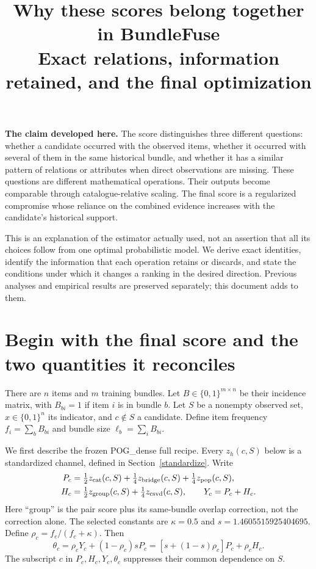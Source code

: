 \documentclass[11pt,a4paper]{article}
\title{Why these scores belong together in BundleFuse\\
\large Exact relations, information retained, and the final optimization}
\author{}\date{}
\begin{document}
\maketitle

\textbf{The claim developed here.}
The score distinguishes three different questions: whether a candidate occurred
with the observed items, whether it occurred with several of them in the same
historical bundle, and whether it has a similar pattern of relations or attributes
when direct observations are missing. These questions are different mathematical
operations. Their outputs become comparable through catalogue-relative scaling.
The final score is a regularized compromise whose reliance on the combined
evidence increases with the candidate's historical support.

This is an explanation of the estimator actually used, not an assertion that all
its choices follow from one optimal probabilistic model. We derive exact identities,
identify the information that each operation retains or discards, and state the
conditions under which it changes a ranking in the desired direction. Previous
analyses and empirical results are preserved separately; this document adds to them.

\section{Begin with the final score and the two quantities it reconciles}
There are $n$ items and $m$ training bundles. Let $B\in\{0,1\}^{m\times n}$
be their incidence matrix, with $B_{bi}=1$ if item $i$ is in bundle $b$.
Let $S$ be a nonempty observed set, $x\in\{0,1\}^n$ its indicator, and
$c\notin S$ a candidate. Define item frequency $f_i=\sum_b B_{bi}$ and
bundle size $\ell_b=\sum_i B_{bi}$.

We first describe the frozen POG\_dense full recipe. Every $z_h(c,S)$ below is
a standardized channel, defined in Section~\ref{standardize}. Write
\begin{align}
 P_c&=\tfrac12z_{\rm cat}(c,S)+\tfrac14z_{\rm bridge}(c,S)
                         +\tfrac14z_{\rm pop}(c,S),\label{prior}\\
 H_c&=\tfrac12z_{\rm group}(c,S)+\tfrac14z_{\rm csvd}(c,S),\qquad Y_c=P_c+H_c.
 \label{hist}
\end{align}
Here ``group'' is the pair score plus its same-bundle overlap correction, not
the correction alone. The selected constants are $\kappa=0.5$ and
$s=1.4605515925404695$. Define $\rho_c=f_c/(f_c+\kappa)$. Then
\begin{equation}\label{final}
 \boxed{\theta_c=\rho_cY_c+(1-\rho_c)sP_c
       =[s+(1-s)\rho_c]P_c+\rho_c H_c.}
\end{equation}
The subscript $c$ in $P_c,H_c,Y_c,\theta_c$ suppresses their common dependence on $S$.
\end{document}
